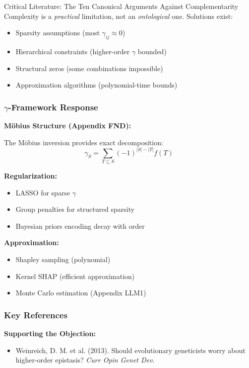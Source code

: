 \begin{chapter}{Critical Literature: The Ten Canonical Arguments Against Complementarity}
Complexity is a \textit{practical} limitation, not an \textit{ontological} one. Solutions exist:
\begin{itemize}[noitemsep]
    \item Sparsity assumptions (most $\gamma_{ij} \approx 0$)
    \item Hierarchical constraints (higher-order $\gamma$ bounded)
    \item Structural zeros (some combinations impossible)
    \item Approximation algorithms (polynomial-time bounds)
\end{itemize}

\subsubsection{$\gamma$-Framework Response}

\textbf{Möbius Structure (Appendix FND):}

The Möbius inversion provides exact decomposition:
\[
\gamma_S = \sum_{T \subseteq S} (-1)^{|S|-|T|} f(T)
\]

\textbf{Regularization:}
\begin{itemize}[noitemsep]
    \item LASSO for sparse $\gamma$
    \item Group penalties for structured sparsity
    \item Bayesian priors encoding decay with order
\end{itemize}

\textbf{Approximation:}
\begin{itemize}[noitemsep]
    \item Shapley sampling (polynomial)
    \item Kernel SHAP (efficient approximation)
    \item Monte Carlo estimation (Appendix LLM1)
\end{itemize}

\subsubsection{Key References}

\textbf{Supporting the Objection:}
\begin{itemize}[noitemsep]
    \item Weinreich, D. M. et al. (2013). Should evolutionary geneticists worry about higher-order epistasis? \textit{Curr Opin Genet Dev}.
\end{itemize}


\end{chapter}
